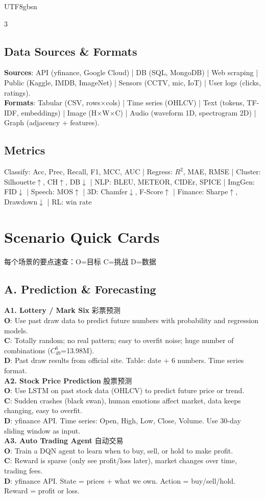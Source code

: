 \documentclass[9pt,landscape,a4paper]{article}
\newcommand{\zhint}[1]{{\scriptsize\color{gray!70!black}#1}}
\newcommand{\scenario}[5]{%
\textbf{#1} \zhint{#2}\\
\textbf{O}: #3\\
\textbf{C}: #4\\
\textbf{D}: #5\\[-3pt]
}
\begin{document}
\begin{CJK}{UTF8}{gbsn}
\begin{multicols}{3}
\subsection{Data Sources \& Formats}
\textbf{Sources}: API (yfinance, Google Cloud) | DB (SQL, MongoDB) | Web scraping | Public (Kaggle, IMDB, ImageNet) | Sensors (CCTV, mic, IoT) | User logs (clicks, ratings).\\
\textbf{Formats}: Tabular (CSV, rows$\times$cols) | Time series (OHLCV) | Text (tokens, TF-IDF, embeddings) | Image (H$\times$W$\times$C) | Audio (waveform 1D, spectrogram 2D) | Graph (adjacency + features).

\subsection{Metrics}
Classify: Acc, Prec, Recall, F1, MCC, AUC | Regress: $R^2$, MAE, RMSE | Cluster: Silhouette$\uparrow$, CH$\uparrow$, DB$\downarrow$ | NLP: BLEU, METEOR, CIDEr, SPICE | ImgGen: FID$\downarrow$ | Speech: MOS$\uparrow$ | 3D: Chamfer$\downarrow$, F-Score$\uparrow$ | Finance: Sharpe$\uparrow$, Drawdown$\downarrow$ | RL: win rate

\section{Scenario Quick Cards}
\zhint{每个场景的要点速查：O=目标 C=挑战 D=数据}

\subsection{A. Prediction \& Forecasting}

\scenario{A1. Lottery / Mark Six}{彩票预测}
{Use past draw data to predict future numbers with probability and regression models.}
{Totally random; no real pattern; easy to overfit noise; huge number of combinations ($C_{49}^{6}$=13.98M).}
{Past draw results from official site. Table: date + 6 numbers. Time series format.}

\scenario{A2. Stock Price Prediction}{股票预测}
{Use LSTM on past stock data (OHLCV) to predict future price or trend.}
{Sudden crashes (black swan), human emotions affect market, data keeps changing, easy to overfit.}
{yfinance API. Time series: Open, High, Low, Close, Volume. Use 30-day sliding window as input.}

\scenario{A3. Auto Trading Agent}{自动交易}
{Train a DQN agent to learn when to buy, sell, or hold to make profit.}
{Reward is sparse (only see profit/loss later), market changes over time, trading fees.}
{yfinance API. State = prices + what we own. Action = buy/sell/hold. Reward = profit or loss.}


\end{multicols}
\end{CJK}
\end{document}
